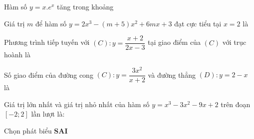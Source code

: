 \documentclass[12pt]{article}
\begin{document}
\setlength{\baselineskip}{12truept}
\begin{vnmultiplechoice}[keycolumns=3]
\begin{question}%
Hàm số $y=x.e^x$ tăng trong khoảng
\datcot
\bonpa
{}
{}
{}
{}
\end{question}

\begin{question}%
Giá trị $m$ để hàm số $y=2x^3-(m+5)x^2+6mx+3$ đạt cực tiểu tại $x=2$ là
\datcot
\bonpa
{}
{}
{}
{}
\end{question}

\begin{question}%
Phương trình tiếp tuyến với $(C): y=\dfrac{x+2}{2x-3}$ tại giao điểm của $(C)$ với trục hoành là
\datcot
\bonpa
{}
{}
{}
{}
\end{question}

\begin{question}%
Số giao điểm của đường cong $(C): y=\dfrac{3x^2}{x+2}$ và đường thẳng $(D): y=2-x$ là
\datcot
\bonpa
{}
{}
{}
{}
\end{question}

\begin{question}%
Giá trị lớn nhất và giá trị nhỏ nhất của hàm số $y=x^3-3x^2-9x+2$ trên đoạn $\left[-2; 2\right]$ lần lượt là:
\datcot
\bonpa
{}
{}
{}
{}
\end{question}

\begin{question}%
Chọn phát biểu \textbf{SAI}
\datcot[4]
\bonpa
{}
{}
{}
{}
\end{question}


\end{vnmultiplechoice}
\end{document}
